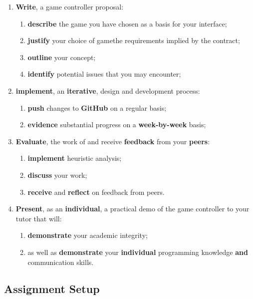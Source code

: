 \documentclass{../fal_assignment}
\begin{document}
\begin{enumerate}[label=(\Alph*)]
    \item \textbf{Write}, a game controller proposal:
    	\begin{enumerate}[label=\roman*.]
    		\item \textbf{describe} the game you have chosen as a basis for your interface;
    		\item \textbf{justify} your choice of gamethe requirements implied by the contract;
		\item \textbf{outline} your concept;
		\item \textbf{identify} potential issues that you may encounter;
	\end{enumerate}
    \item \textbf{implement}, an \textbf{iterative}, design and development process:
    	\begin{enumerate}[label=\roman*.]
    		\item \textbf{push} changes to \textbf{GitHub} on a regular basis;
    		\item \textbf{evidence} substantial progress on a \textbf{week-by-week} basis;
	\end{enumerate}
    \item \textbf{Evaluate}, the work of and receive \textbf{feedback} from your \textbf{peers}:
    	\begin{enumerate}[label=\roman*.]
    		\item \textbf{implement} heuristic analysis;
		\item \textbf{discuss} your work;
		\item \textbf{receive} and \textbf{reflect} on feedback from peers. 
	\end{enumerate}
    \item \textbf{Present}, as an \textbf{individual}, a practical demo of the game controller to your tutor that will:
    	\begin{enumerate}[label=\roman*.]
    		\item \textbf{demonstrate} your academic integrity;
    		\item as well as \textbf{demonstrate} your \textbf{individual} programming knowledge \textbf{and} communication skills.
	\end{enumerate}
\end{enumerate}

\subsection*{Assignment Setup}
\end{document}

